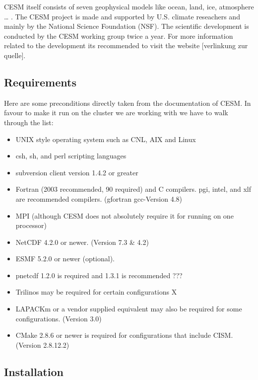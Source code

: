 \documentclass[]{article}
\providecommand{\tightlist}{%
  \setlength{\itemsep}{0pt}\setlength{\parskip}{0pt}}
\begin{document}
CESM itself consists of seven geophysical models like ocean, land, ice,
atmosphere \ldots{} . The CESM project is made and supported by U.S.
climate reseachers and mainly by the National Science Foundation (NSF).
The scientific development is conducted by the CESM working group twice
a year. For more information related to the development its recommended
to visit the website {[}verlinkung zur quelle{]}.

\subsection{Requirements}\label{requirements}

Here are some preconditions directly taken from the documentation of
CESM. In favour to make it run on the cluster we are working with we
have to walk through the list:

\begin{itemize}
\tightlist
\item
  UNIX style operating system such as CNL, AIX and Linux \checkmark  
\item
  csh, sh, and perl scripting languages \checkmark  
\item
  subversion client version 1.4.2 or greater \checkmark  
\item
  Fortran (2003 recommended, 90 required) and C compilers. pgi, intel,
  and xlf are recommended compilers. \checkmark (gfortran gcc-Version
  4.8)
\item
  MPI (although CESM does not absolutely require it for running on one
  processor) \checkmark
\item
  NetCDF 4.2.0 or newer. \checkmark (Version 7.3 \& 4.2)
\item
  ESMF 5.2.0 or newer (optional).
\item
  pnetcdf 1.2.0 is required and 1.3.1 is recommended ???
\item
  Trilinos may be required for certain configurations X
\item
  LAPACKm or a vendor supplied equivalent may also be required for some
  configurations. \checkmark (Version 3.0)
\item
  CMake 2.8.6 or newer is required for configurations that include CISM.
  \checkmark (Version 2.8.12.2)
\end{itemize}

\subsection{Installation}\label{installation-1}
\end{document}
